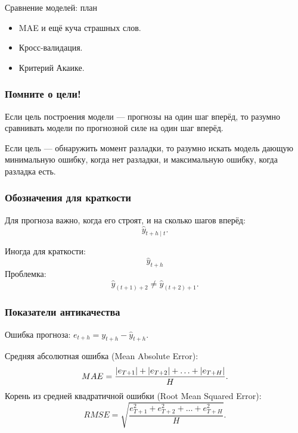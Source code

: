 
\begin{frame} %


\end{frame}



\begin{frame}{Сравнение моделей: план}
  \begin{itemize}[<+->]
    \item MAE и ещё куча страшных слов. 
    \item Кросс-валидация.
    \item Критерий Акаике.
  \end{itemize}

\end{frame}


\begin{frame}
  \frametitle{Помните о цели!}

  Если цель построения модели — прогнозы на один шаг вперёд, 
  то разумно сравнивать модели по прогнозной силе на один шаг вперёд. 

  \pause
  Если цель — обнаружить момент разладки,
  то разумно искать модель дающую минимальную ошибку, когда нет разладки, 
  и максимальную ошибку, когда разладка есть. 

\end{frame}

\begin{frame}
    \frametitle{Обозначения для краткости}

    Для прогноза важно, \alert{когда} его строят, и на \alert{сколько шагов вперёд}:
    \[
    \hat y_{t+h \mid t}.    
    \]

    \pause 
    Иногда для \alert{краткости}:
    \[
    \hat y_{t+h}    
    \]
    \pause 
    Проблемка:
    \[
    \hat y_{(t+1) + 2} \neq \hat y_{(t+2) + 1}.    
    \]    
    
\end{frame}


\begin{frame}
    \frametitle{Показатели антикачества}

    \alert{Ошибка прогноза}: $e_{t+h} = y_{t+h} - \hat y_{t+h}$.

    \pause
    \alert{Средняя абсолютная ошибка} (Mean Absolute Error):
    \[
    MAE = \frac{\abs {e_{T+1}} + \abs{e_{T+2}}+ \ldots + \abs{e_{T+H}} }{H}.
    \]
    \pause
    \alert{Корень из средней квадратичной ошибки} (Root Mean Squared Error):
    \[
        RMSE = \sqrt{ \frac{e^2_{T+1} + e^2_{T+2}+ \ldots + e^2_{T+H} }{H} }.
    \]
    
\end{frame}


